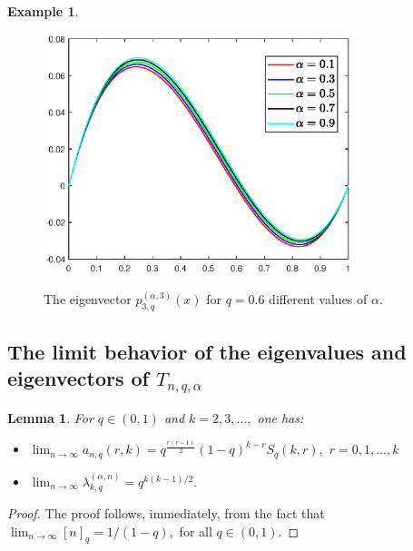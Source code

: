 \documentclass[12pt]{article}
\numberwithin{equation}{section} \theoremstyle{plain}
\newtheorem{lemma}[theorem]{Lemma}
\theoremstyle{definition}
\newtheorem{example}{Example}[section]
\theoremstyle{remark}
\begin{document}
\begin{example}
\begin{figure}[!ht]
\begin{center}
{\includegraphics[width=0.8\textwidth]{fig2}} 
\caption{The eigenvector $p_{3,q}^{(\alpha,3)}(x)$ for $q=0.6$ different values of $\alpha.$} 
\label{fig2}
\end{center}\vspace{-4mm}
\end{figure}

\end{example}



\subsection{The limit behavior of the eigenvalues and eigenvectors of $T_{n,q,\alpha}$}

\begin{lemma}
For $q\in(0, 1)$ and $k=2,3,\ldots,$ one has:
\begin{itemize}
\item [(i)] $\displaystyle \lim_{n\rightarrow\infty} a_{n,q}(r,k)=q^\frac{r(r-1)}{2}(1-q)^{k-r}S_q(k,r),$ $r=0,1,\ldots, k$
\end{itemize}
\begin{itemize}
\item [(ii)] $\displaystyle \lim_{n\rightarrow\infty} \lambda_{k,q}^{(\alpha,n)}=q^{k(k-1)/2}.$
\end{itemize}
\end{lemma}
\begin{proof}
The proof follows, immediately, from the fact that $\lim_{n\to\infty}[n]_q=1/(1-q),$ for all $q\in(0, 1).$ 
\end{proof}
\end{document}
